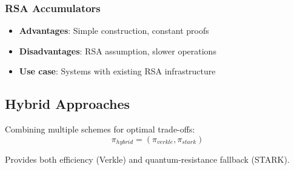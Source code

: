 \subsubsection{RSA Accumulators}
\begin{itemize}
    \item \textbf{Advantages}: Simple construction, constant proofs
    \item \textbf{Disadvantages}: RSA assumption, slower operations
    \item \textbf{Use case}: Systems with existing RSA infrastructure
\end{itemize}

\subsection{Hybrid Approaches}

Combining multiple schemes for optimal trade-offs:
\begin{equation}
    \pi_{hybrid} = (\pi_{verkle}, \pi_{stark})
\end{equation}

Provides both efficiency (Verkle) and quantum-resistance fallback (STARK).

